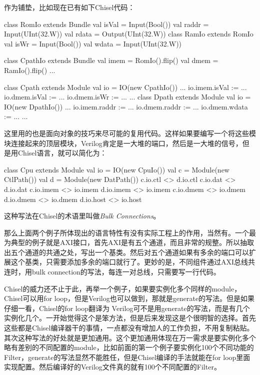 \documentclass{article}
\begin{document}
\begin{multicols}{2}
作为铺垫，比如现在已有如下Chisel代码：
\begin{scala}
	class RomIo extends Bundle {
		val isVal = Input(Bool())
		val raddr = Input(UInt(32.W))
		val rdata = Output(UInt(32.W))
	}
	class RamIo extends RomIo {
		val isWr = Input(Bool())
		val wdata = Input(UInt(32.W))
	}
	
	class CpathIo extends Bundle {
		val imem = RomIo().flip()
		val dmem = RamIo().flip()
		...
	}
	
	class Cpath extends Module {
		val io = IO(new CpathIo())
		...
		io.imem.isVal := ...
		io.dmem.isVal := ...
		io.dmem.isWr := ...
		...
	}
	class Dpath extends Module {
		val io = IO(new DpathIo())
		...
		io.imem.raddr := ...	
		io.dmem.raddr := ...
		io.dmem.wdata := ...
		...
	}
\end{scala}
这里用的也是面向对象的技巧来尽可能的复用代码。这样如果要编写一个将这些模块连接起来的顶层模块，Verilog肯定是一大堆的端口，然后是一大堆的信号，但是用Chisel语言，就可以简化为：
\begin{scala}
	class Cpu extends Module {
		val io = IO(new CpuIo())
		val c = Module(new CtlPath())
		val d = Module(new DatPath())
		c.io.ctl <> d.io.ctl
		c.io.dat <> d.io.dat
		c.io.imem <> io.imem
		d.io.imem <> io.imem
		c.io.dmem <> io.dmem
		d.io.dmem <> io.dmem
		d.io.host <> io.host
	}
\end{scala}
这种写法在Chisel的术语里叫做\textit{Bulk Connections}。		
	\end{multicols}

	那么上面两个例子所体现出的语言特性有没有实际工程上的作用，当然有。一个最为典型的例子就是AXI接口，首先AXI是有五个通道，而且非常的规整。所以抽取出五个通道的共通之处，写出一个基类。然后对五个通道如果有多余的端口可以扩展这个基类，只需要添加多余的端口就行了。更妙的是，不同组件通过AXI总线共连时，用bulk connection的写法，每连一对总线，只需要写一行代码。
	
	Chisel的威力还不止于此，再举一个例子，如果要实例化多个同样的module，Chisel可以用for loop，但是Verilog也可以做到，那就是generate的写法。但是如果仔细一看，Chisel的for loop翻译为
	Verilog可不是用generate的写法，而是有几个实例化几个。一开始觉得这个是笨方法，但是后来发现这是个很明智的选择。首先这些都是Chisel编译器干的事情，一点都没有增加人的工作负担，不用复制粘贴。其次这种写法的好处就是更加通用。这个更加通用体现在万一需求是要实例化多个略有差别的不同配置的module，比如前面的第一个例子要实例化100个不同功能的Filter，generate的写法显然不能胜任，但是Chisel编译的手法就能在for loop里面实现配置。然后编译好的Verilog文件真的就有100个不同配置的Filter。
	
\end{document}
